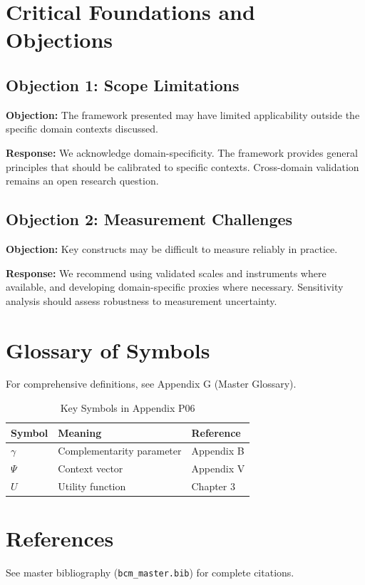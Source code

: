 \section{Critical Foundations and Objections}
\label{sec:p06-foundations}

\subsection{Objection 1: Scope Limitations}

\textbf{Objection:} The framework presented may have limited applicability
outside the specific domain contexts discussed.

\textbf{Response:} We acknowledge domain-specificity. The framework provides
general principles that should be calibrated to specific contexts. Cross-domain
validation remains an open research question.

\subsection{Objection 2: Measurement Challenges}

\textbf{Objection:} Key constructs may be difficult to measure reliably in
practice.

\textbf{Response:} We recommend using validated scales and instruments where
available, and developing domain-specific proxies where necessary. Sensitivity
analysis should assess robustness to measurement uncertainty.



\section{Glossary of Symbols}
\label{sec:p06-glossary}

For comprehensive definitions, see Appendix G (Master Glossary).

\begin{table}[htbp]
\centering
\caption{Key Symbols in Appendix P06}
\begin{tabular}{lll}
\toprule
\textbf{Symbol} & \textbf{Meaning} & \textbf{Reference} \\
\midrule
$\gamma$ & Complementarity parameter & Appendix B \\
$\Psi$ & Context vector & Appendix V \\
$U$ & Utility function & Chapter 3 \\
\bottomrule
\end{tabular}
\end{table}


\section{References}
\label{sec:p06-references}

See master bibliography (\texttt{bcm\_master.bib}) for complete citations.

\nocite{bcm_master}

